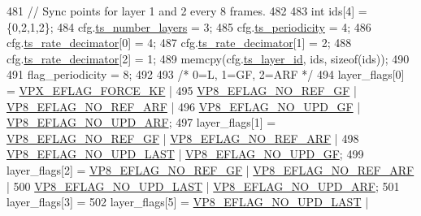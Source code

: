 \begin{DoxyCodeInclude}
{{{{{{{{{{{{{{{481         \textcolor{comment}{// Sync points for layer 1 and 2 every 8 frames.}
482 
483         \textcolor{keywordtype}{int} ids[4] = \{0,2,1,2\};
484         cfg.\hyperlink{structvpx__codec__enc__cfg_a16d4549a30cbd585e3c3056ef873d8c7}{ts\_number\_layers}     = 3;
485         cfg.\hyperlink{structvpx__codec__enc__cfg_a4ec338780115dd270acf0dac24193474}{ts\_periodicity}       = 4;
486         cfg.\hyperlink{structvpx__codec__enc__cfg_ad40c30846ef8ef1d8684f10a491ec535}{ts\_rate\_decimator}[0] = 4;
487         cfg.\hyperlink{structvpx__codec__enc__cfg_ad40c30846ef8ef1d8684f10a491ec535}{ts\_rate\_decimator}[1] = 2;
488         cfg.\hyperlink{structvpx__codec__enc__cfg_ad40c30846ef8ef1d8684f10a491ec535}{ts\_rate\_decimator}[2] = 1;
489         memcpy(cfg.\hyperlink{structvpx__codec__enc__cfg_a4d105d2470dbfb7210b33d298f1cf1f6}{ts\_layer\_id}, ids, \textcolor{keyword}{sizeof}(ids));
490 
491         flag\_periodicity = 8;
492 
493         \textcolor{comment}{/* 0=L, 1=GF, 2=ARF */}
494         layer\_flags[0] = \hyperlink{group__encoder_ga4c4f4e3cbb5225d2c6c050e2d1e948fa}{VPX\_EFLAG\_FORCE\_KF}  |
495                          \hyperlink{group__vp8__encoder_gabb5e95343a2738abef44eca13059da33}{VP8\_EFLAG\_NO\_REF\_GF} | 
      \hyperlink{group__vp8__encoder_ga650ab0baea12be91082226a5cc18776a}{VP8\_EFLAG\_NO\_REF\_ARF} |
496                          \hyperlink{group__vp8__encoder_gab01d066c5236457d345ce1cab4c41d6b}{VP8\_EFLAG\_NO\_UPD\_GF} | 
      \hyperlink{group__vp8__encoder_ga1cff46a5287e73a620660030d40b9e6c}{VP8\_EFLAG\_NO\_UPD\_ARF};
497         layer\_flags[1] = \hyperlink{group__vp8__encoder_gabb5e95343a2738abef44eca13059da33}{VP8\_EFLAG\_NO\_REF\_GF} | 
      \hyperlink{group__vp8__encoder_ga650ab0baea12be91082226a5cc18776a}{VP8\_EFLAG\_NO\_REF\_ARF} |
498                          \hyperlink{group__vp8__encoder_ga602edb6b02a89cb2db7a16d6dffba583}{VP8\_EFLAG\_NO\_UPD\_LAST} | 
      \hyperlink{group__vp8__encoder_gab01d066c5236457d345ce1cab4c41d6b}{VP8\_EFLAG\_NO\_UPD\_GF};
499         layer\_flags[2] = \hyperlink{group__vp8__encoder_gabb5e95343a2738abef44eca13059da33}{VP8\_EFLAG\_NO\_REF\_GF}   | 
      \hyperlink{group__vp8__encoder_ga650ab0baea12be91082226a5cc18776a}{VP8\_EFLAG\_NO\_REF\_ARF} |
500                          \hyperlink{group__vp8__encoder_ga602edb6b02a89cb2db7a16d6dffba583}{VP8\_EFLAG\_NO\_UPD\_LAST} | 
      \hyperlink{group__vp8__encoder_ga1cff46a5287e73a620660030d40b9e6c}{VP8\_EFLAG\_NO\_UPD\_ARF};
501         layer\_flags[3] =
502         layer\_flags[5] = \hyperlink{group__vp8__encoder_ga602edb6b02a89cb2db7a16d6dffba583}{VP8\_EFLAG\_NO\_UPD\_LAST} | 
}}}}}}}}}}}}}}}
\end{DoxyCodeInclude}
